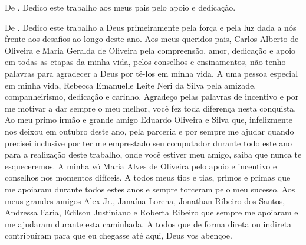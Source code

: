 \begin{dedicatoria}
\vspace*{\fill}
\vspace*{\fill}
\vspace*{\fill}
\vspace*{\fill}
\vspace*{\fill}
\vspace*{\fill}
De \imprimirAutorUm.
\newline
Dedico este trabalho aos meus pais pelo apoio e dedicação.

\vspace*{\fill}
De \imprimirAutorDois.
\newline
Dedico este trabalho a Deus primeiramente pela força e pela luz dada a nós frente aos desafios
ao longo deste ano. Aos meus queridos pais, Carlos Alberto de Oliveira e Maria Geralda de Oliveira pela
compreensão, amor, dedicação e apoio em todas as etapas da minha vida, pelos conselhos e ensinamentos, não tenho 
palavras para agradecer a Deus por tê-los em minha vida. A uma pessoa especial em minha vida, Rebecca Emanuelle 
Leite Neri da Silva pela amizade, companheirismo, dedicação e carinho. Agradeço pelas palavras de incentivo
e por me motivar a dar sempre o meu melhor, você fez toda diferença nesta conquista. Ao meu primo irmão e grande amigo Eduardo 
Oliveira e Silva que, infelizmente nos deixou em outubro deste ano, pela parceria e por sempre me ajudar quando precisei 
inclusive por ter me emprestado seu computador durante todo este ano para a realização deste trabalho, onde você estiver meu amigo, 
saiba que nunca te esqueceremos. A minha vó Maria Alves de Oliveira pelo apoio e incentivo e conselhos nos momentos 
difíceis. A todos meus tios e tias, primos e primas que me apoiaram durante todos estes anos e sempre torceram pelo meu 
sucesso. Aos meus grandes amigos Alex Jr., Janaína Lorena, Jonathan Ribeiro dos Santos, Andressa Faria, Edilson Justiniano 
e Roberta Ribeiro que sempre me apoiaram e me ajudaram durante esta caminhada. A todos que de forma direta ou indireta 
contribuíram para que eu chegasse até aqui, Deus vos abençoe.

\end{dedicatoria}
